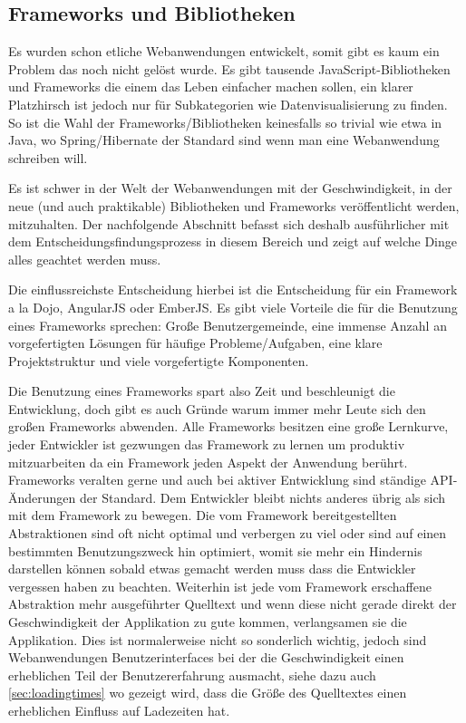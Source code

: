 \documentclass[12pt,twoside]{book}
\begin{document}
\subsection{Frameworks und Bibliotheken}

Es wurden schon etliche Webanwendungen entwickelt, somit gibt es kaum ein Problem das noch nicht gelöst wurde. Es gibt tausende JavaScript-Bibliotheken und Frameworks die einem das Leben einfacher machen sollen, ein klarer Platzhirsch ist jedoch nur für Subkategorien wie Datenvisualisierung zu finden. So ist die Wahl der Frameworks/Bibliotheken keinesfalls so trivial wie etwa in Java, wo Spring/Hibernate der Standard sind wenn man eine Webanwendung schreiben will.

Es ist schwer in der Welt der Webanwendungen mit der Geschwindigkeit, in der neue (und auch praktikable) Bibliotheken und Frameworks veröffentlicht werden, mitzuhalten. Der nachfolgende Abschnitt befasst sich deshalb ausführlicher mit dem Entscheidungsfindungsprozess in diesem Bereich und zeigt auf welche Dinge alles geachtet werden muss.

Die einflussreichste Entscheidung hierbei ist die Entscheidung für ein Framework a la Dojo\cite{dojo}, AngularJS\cite{angularjs} oder EmberJS\cite{emberjs}.
Es gibt viele Vorteile die für die Benutzung eines Frameworks sprechen: Große Benutzergemeinde, eine immense Anzahl an vorgefertigten Lösungen für häufige Probleme/Aufgaben, eine klare Projektstruktur und viele vorgefertigte Komponenten.

Die Benutzung eines Frameworks spart also Zeit und beschleunigt die Entwicklung, doch gibt es auch Gründe warum immer mehr Leute sich den großen Frameworks abwenden.
Alle Frameworks besitzen eine große Lernkurve, jeder Entwickler ist gezwungen das Framework zu lernen um produktiv mitzuarbeiten da ein Framework jeden Aspekt der Anwendung berührt. Frameworks veralten gerne und auch bei aktiver Entwicklung sind ständige API-Änderungen der Standard. Dem Entwickler bleibt nichts anderes übrig als sich mit dem Framework zu bewegen. Die vom Framework bereitgestellten Abstraktionen sind oft nicht optimal und verbergen zu viel oder sind auf einen bestimmten Benutzungszweck hin optimiert, womit sie mehr ein Hindernis darstellen können sobald etwas gemacht werden muss dass die Entwickler vergessen haben zu beachten.
Weiterhin ist jede vom Framework erschaffene Abstraktion mehr ausgeführter Quelltext und wenn diese nicht gerade direkt der Geschwindigkeit der Applikation zu gute kommen, verlangsamen sie die Applikation. Dies ist normalerweise nicht so sonderlich wichtig, jedoch sind Webanwendungen Benutzerinterfaces bei der die Geschwindigkeit einen erheblichen Teil der Benutzererfahrung ausmacht, siehe dazu auch \ref{sec:loadingtimes} wo gezeigt wird, dass die Größe des Quelltextes einen erheblichen Einfluss auf Ladezeiten hat.
\end{document}
